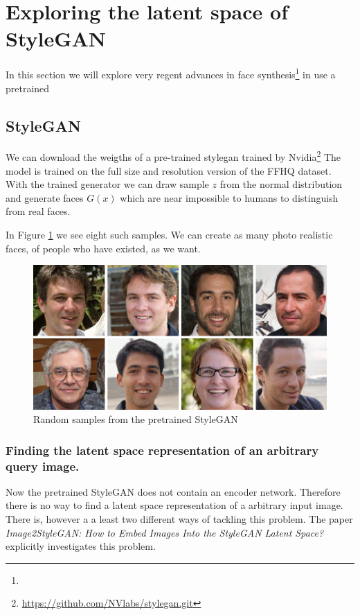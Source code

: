 \newpage
\section{Exploring the latent space of StyleGAN}

In this section we will explore  very regent advances in face synthesis\footnote{} in use a pretrained

\subsection{StyleGAN}

We can download the weigths of a pre-trained stylegan trained by Nvidia\footnote{\url{https://github.com/NVlabs/stylegan.git}}\cite{stylegan}
The model is trained on the full size and resolution version of the FFHQ dataset.
With the trained generator we can draw sample $z$ from the normal distribution and generate faces $G(x)$ which are near impossible to humans to distinguish from real faces.

In Figure \ref{StyleGAN-examples} we see eight such samples. We can create as many photo realistic faces, of people who have existed, as we want.
\begin{figure}[h!]
  \includegraphics[width=\textwidth]{fig/stylegan/randomsamples}
  \caption{Random samples from the pretrained StyleGAN}
  \label{StyleGAN-examples}
\end{figure}




\subsubsection{Finding the latent space representation of an arbitrary query image.}
Now the pretrained StyleGAN does not contain an encoder network. Therefore there is no way to find a latent space representation of a arbitrary input image.
There is, however a a least two different ways of tackling this problem.
%
\cite{interfacegan}
The paper \textit{Image2StyleGAN: How to Embed Images Into the StyleGAN Latent Space?}\cite{Image2StyleGAN} explicitly investigates this problem.


